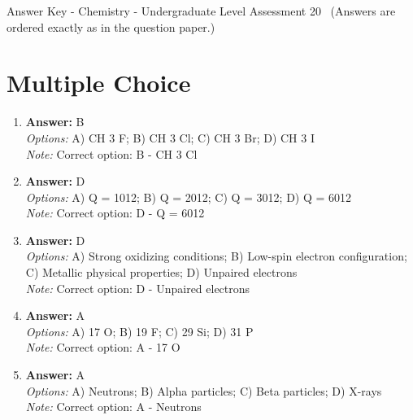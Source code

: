\documentclass[12pt]{article}
\begin{document}
\begin{center}
Answer Key - Chemistry - Undergraduate Level Assessment 20 \
\small (Answers are ordered exactly as in the question paper.)
\end{center}

\section*{Multiple Choice}
\begin{enumerate}[label=\arabic*.]
\item \textbf{Answer:} B
\\ \textit{Options:} A) CH 3 F; B) CH 3 Cl; C) CH 3 Br; D) CH 3 I
\\ \textit{Note:} Correct option: B - CH 3 Cl
\item \textbf{Answer:} D
\\ \textit{Options:} A) Q = 1012; B) Q = 2012; C) Q = 3012; D) Q = 6012
\\ \textit{Note:} Correct option: D - Q = 6012
\item \textbf{Answer:} D
\\ \textit{Options:} A) Strong oxidizing conditions; B) Low-spin electron configuration; C) Metallic physical properties; D) Unpaired electrons
\\ \textit{Note:} Correct option: D - Unpaired electrons
\item \textbf{Answer:} A
\\ \textit{Options:} A) 17 O; B) 19 F; C) 29 Si; D) 31 P
\\ \textit{Note:} Correct option: A - 17 O
\item \textbf{Answer:} A
\\ \textit{Options:} A) Neutrons; B) Alpha particles; C) Beta particles; D) X-rays
\\ \textit{Note:} Correct option: A - Neutrons
\end{enumerate}
\end{document}
